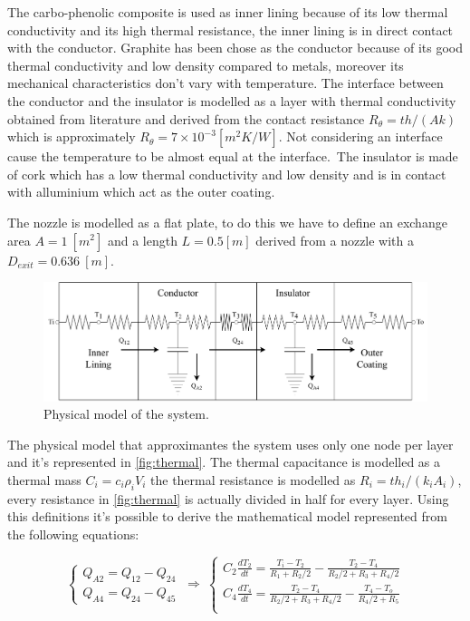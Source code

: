 \documentclass[11pt,a4paper,oneside]{article}
\begin{document}
The carbo-phenolic composite is used as inner lining because of its low thermal conductivity and 
its high thermal resistance, the inner lining is in direct contact with the conductor. Graphite has
been chose as the conductor because of its good thermal conductivity and low density compared to metals,
moreover its mechanical characteristics don't vary with temperature. The interface between the conductor
and the insulator is modelled as a layer with thermal conductivity obtained from literature and derived
from the contact resistance $R_\theta =th/(Ak)$ which is approximately $R_\theta = 7\times 10^{-3} [m^2K/W]$.
Not considering an interface cause the temperature to be almost equal at the interface.\
The insulator is made of cork which has a low thermal conductivity and low density and is in contact 
with alluminium which act as the outer coating.\

The nozzle is modelled as a flat plate, to do this we have to define an exchange area $A=1\ [m^2]$ 
and a length $L=0.5 [m]$ derived from a nozzle with a $D_{exit}=0.636\ [m]$. 

\begin{figure}[h!]
    \centering
    \includegraphics[width=1\textwidth]{gfx/thermal_model.pdf}
    \caption{\label{fig:thermal} Physical model of the system.}
\end{figure}
    
The physical model that approximantes the system uses only one node per layer and it's represented in 
\autoref{fig:thermal}. The thermal capacitance is modelled as a thermal mass $C_i=c_i\rho_i V_i$
the thermal resistance is modelled as $R_i=th_i/(k_iA_i)$, every resistance in \autoref{fig:thermal}
is actually divided in half for every layer. Using this definitions it's possible to derive the 
mathematical model represented from the following equations:

\begin{equation}
    \begin{cases}
      Q_{A2}=Q_{12}-Q_{24}\\
      Q_{A4}=Q_{24}-Q_{45}
    \end{cases}\
    \Rightarrow\
    \begin{cases}
        C_{2}\frac{dT_2}{dt}=\frac{T_i-T_2}{R_1+R_2/2} - \frac{T_2-T_4}{R_2/2+R_3+R_4/2}\\
        C_{4}\frac{dT_4}{dt}=\frac{T_2-T_4}{R_2/2+R_3+R_4/2} - \frac{T_4-T_o}{R_4/2+R_5}\\
    \end{cases}
\end{equation}
\end{document}
